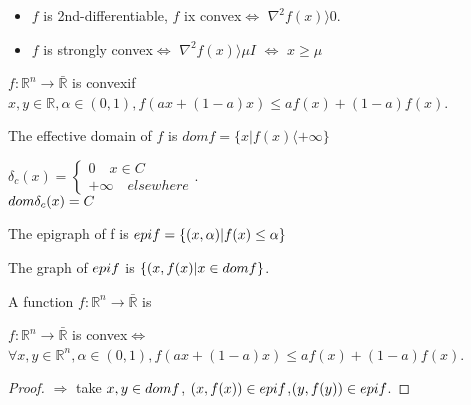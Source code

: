 \documentclass[11pt,fleqn]{book} %
\def\R{\mathbb{R}}
\newcommand{\cvx}{convex}
\begin{document}
\begin{remark}
\begin{itemize}
\item $f$ is 2nd-differentiable, $f$ ix \cvx $\iff$ $\nabla^2f(x) \rangle  0$.
\item $f$ is strongly \cvx $\iff$ $\nabla^2f(x) \rangle  \mu I$ $\iff$ $x \ge \mu$
\end{itemize}
\end{remark}
\begin{definition}[2]
$f : \R^n \to \bar{\R} $ is \cvx  if $x, y  \in \R , \alpha \in (0,1), f(ax + (1-a)x) \le af(x) + (1-a)f(x)$.  
\end{definition}
The effective domain of $f$ is $dom f = \{x | f(x) \langle + \infty \}$ 
\begin{example}
$\delta_c(x) = \begin{cases}
0 \quad  x \in C \\
+ \infty \quad elsewhere
\end{cases}$.\\
$dom \space \delta_c(x) = C$
\end{example}
\begin{definition}[Epigraph]
The epigraph of f is $epi \space f = \{(x,\alpha) | f(x) \le \alpha\}$
\end{definition}
The graph of $epi \space f$ is $\{ (x,f(x) | x \in dom \space f\}$.
\begin{definition}[III]
A function $f : \R^n \to \bar{\R}$ is %
\end{definition}
\begin{theorem}
$f : \R^n \to \bar{\R}$ is \cvx  $\iff$ $\forall x,y \in \R^n, \alpha \in (0,1), f(ax + (1-a)x) \le af(x) + (1-a)f(x)$.
\end{theorem}
\begin{proof}
$\Rightarrow$ take $x,y \in dom \space f$, $(x,f(x)) \in epi \space f$,$(y,f(y)) \in epi \space f$.
\end{proof}
\end{document}
